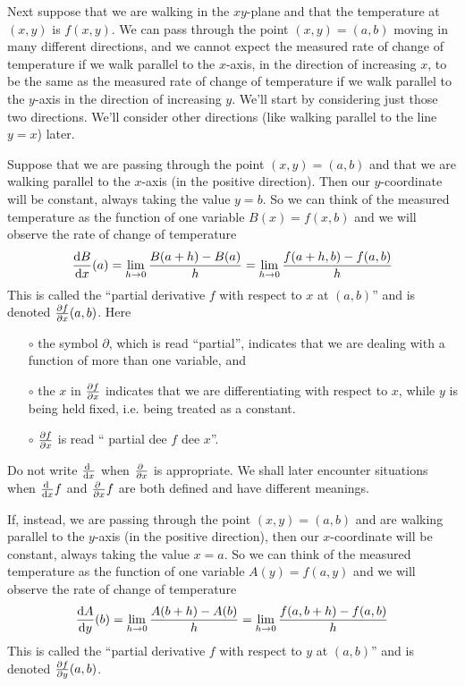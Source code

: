 Next suppose that we are walking in the $xy$-plane and that the temperature
at $(x,y)$ is $f(x,y)$. We can pass through the point $(x,y)=(a,b)$ moving
in many different directions, and we cannot expect the measured rate of
change of temperature if we walk parallel to the $x$-axis, in the
direction of increasing $x$, to be the same as the measured rate of change of temperature if we walk parallel to the $y$-axis in the direction of increasing $y$. We'll start by considering just those two directions. We'll consider
other directions (like walking parallel to the line $y=x$) later.

Suppose that we are passing through the point $(x,y)=(a,b)$ and that 
we are walking parallel to the $x$-axis (in the positive direction). 
Then our $y$-coordinate will be constant, always taking the value $y=b$. 
So we can think of the measured temperature as the function of one 
variable $B(x) = f(x,b)$ and we will observe the rate of change of temperature 
\begin{equation*}
\diff{B}{x}(a) = \lim_{h\rightarrow 0}\frac{B(a+h) - B(a)}{h}
      = \lim_{h\rightarrow 0}\frac{f(a+h,b) - f(a,b)}{h}
\end{equation*}
This is called the ``partial derivative $f$ with respect to $x$ at $(a,b)$''
and is denoted $\pdiff{f}{x}(a,b)$. Here
\begin{itemize}\itemsep1pt \parskip0pt 
\item[$\circ$] 
the symbol $\partial$, which is read ``partial'', indicates that 
we are dealing with a function of more than one variable, and 
\item[$\circ$] 
the $x$ in ${\pdiff{f}{x}}$ indicates that we are differentiating 
with respect to $x$, while $y$ is being held fixed, i.e. being treated as a constant.
\item[$\circ$] 
${\pdiff{f}{x}}$ is read `` partial dee $f$ dee $x$''.
\end{itemize}
Do not write $\diff{}{x}$ when $\pdiff{}{x}$ is appropriate.
We shall later encounter situations when $\diff{}{x}f$ and
$\pdiff{}{x}f$ are both defined and have different meanings.


If, instead, we are passing through the point $(x,y)=(a,b)$ and 
are walking parallel to the $y$-axis (in the positive direction), 
then our $x$-coordinate will be constant, always taking the value $x=a$. 
So we can think of the measured temperature as the function of one 
variable $A(y) = f(a,y)$ and we will observe the rate of change of temperature 
\begin{equation*}
\diff{A}{y}(b) = \lim_{h\rightarrow 0}\frac{A(b+h) - A(b)}{h}
      = \lim_{h\rightarrow 0}\frac{f(a,b+h) - f(a,b)}{h}
\end{equation*}
This is called the ``partial derivative $f$ with respect to $y$ at $(a,b)$''
and is denoted $\pdiff{f}{y}(a,b)$.


